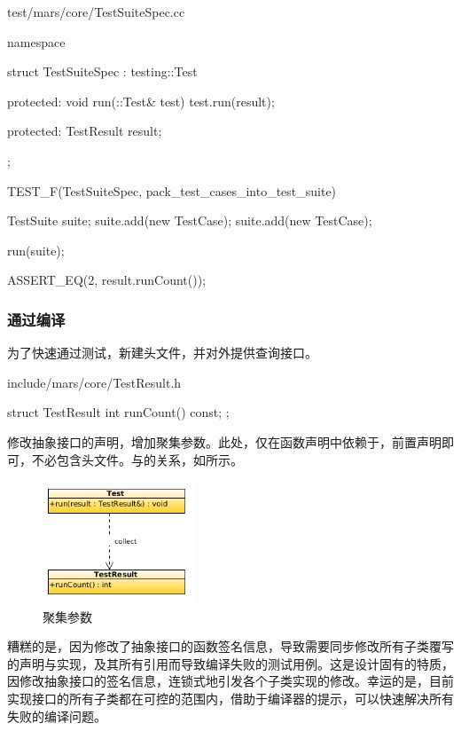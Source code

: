 \begin{content}
\begin{nodiff}{test/mars/core/TestSuiteSpec.cc}
\begin{c++}
namespace {
  struct TestSuiteSpec : testing::Test {
  protected:
    void run(::Test& test) {
      test.run(result);
    }

  protected:
    TestResult result;
  };
}

TEST_F(TestSuiteSpec, pack_test_cases_into_test_suite) {
  TestSuite suite;
  suite.add(new TestCase);
  suite.add(new TestCase);

  run(suite);

  ASSERT_EQ(2, result.runCount());
}
 \end{c++}
\end{nodiff}

\subsubsection{通过编译}

为了快速通过测试，新建头文件，并对外提供查询接口。

\begin{nodiff}{include/mars/core/TestResult.h}
 \begin{c++}
struct TestResult {
  int runCount() const;
};
 \end{c++}
\end{nodiff}

修改抽象接口的声明，增加聚集参数。此处，仅在函数声明中依赖于，前置声明即可，不必包含头文件。与的关系，如所示。

\begin{figure}
\centering
\includegraphics[width=0.4\textwidth]{figures/xunit/test-result.png}
\caption{聚集参数}
 \label{fig:test-result}
\end{figure}

糟糕的是，因为修改了抽象接口的函数签名信息，导致需要同步修改所有子类覆写的声明与实现，及其所有引用而导致编译失败的测试用例。这是设计固有的特质，因修改抽象接口的签名信息，连锁式地引发各个子类实现的修改。幸运的是，目前实现接口的所有子类都在可控的范围内，借助于编译器的提示，可以快速解决所有失败的编译问题。


\end{content}
